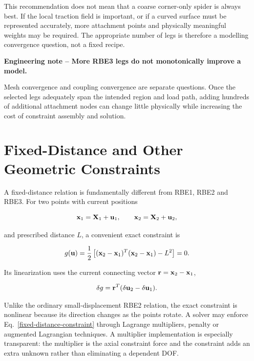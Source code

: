 This recommendation does not mean that a coarse corner-only spider is always
best. If the local traction field is important, or if a curved surface must be
represented accurately, more attachment points and physically meaningful
weights may be required. The appropriate number of legs is therefore a modelling
convergence question, not a fixed recipe.

\begin{bbox}
\textbf{Engineering note -- More RBE3 legs do not monotonically improve a model.}

Mesh convergence and coupling convergence are separate questions. Once the
selected legs adequately span the intended region and load path, adding hundreds
of additional attachment nodes can change little physically while increasing
the cost of constraint assembly and solution.
\end{bbox}

\section{Fixed-Distance and Other Geometric Constraints}

A fixed-distance relation is fundamentally different from RBE1, RBE2 and RBE3.
For two points with current positions

\begin{equation}
    \mathbf{x}_1=\mathbf{X}_1+\mathbf{u}_1,
    \qquad
    \mathbf{x}_2=\mathbf{X}_2+\mathbf{u}_2,
\end{equation}

and prescribed distance $L$, a convenient exact constraint is

\begin{equation}\label{fixed-distance-constraint}
    g(\mathbf{u})=\frac{1}{2}
    \left[(\mathbf{x}_2-\mathbf{x}_1)^T(\mathbf{x}_2-\mathbf{x}_1)-L^2\right]=0.
\end{equation}

Its linearization uses the current connecting vector
$\mathbf{r}=\mathbf{x}_2-\mathbf{x}_1$,

\begin{equation}
    \delta g = \mathbf{r}^T(\delta\mathbf{u}_2-\delta\mathbf{u}_1).
\end{equation}

Unlike the ordinary small-displacement RBE2 relation, the exact constraint is
nonlinear because its direction changes as the points rotate. A solver may
enforce Eq.~\eqref{fixed-distance-constraint} through Lagrange multipliers,
penalty or augmented Lagrangian techniques. A multiplier implementation is
especially transparent: the multiplier is the axial constraint force and the
constraint adds an extra unknown rather than eliminating a dependent DOF.

